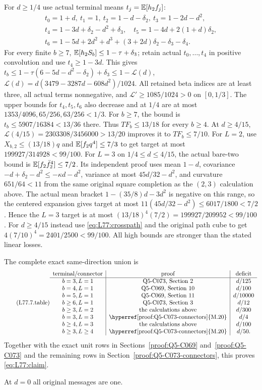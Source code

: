 For $d\ge1/4$ use actual terminal means $t_j=\mathbb E[h_2f_j]$:
\begin{equation}\tag{L77.7.1}\label{eq:L77:means}
\begin{gathered}
t_0=1+d,\ t_1=1,\ t_2=1-d-\delta_2,\ t_3=1-2d-d^2,\\
t_4=1-3d+\delta_2-d^2+\delta_3,\quad
t_5=1-4d+2(1+d)\delta_2,\\
t_6=1-5d+2d^2+d^3+(3+2d)\delta_2-\delta_3-\delta_4.
\end{gathered}
\end{equation}
For every finite $b\ge7$, $\mathbb E[h_2S_b]\le1-\tau+\delta_3$;
retain actual $t_0,\ldots,t_4$ in positive convolution and use
$t_4\ge1-3d$. This gives
$t_b\le1-\tau(6-5d-d^2-\delta_2)+\delta_3
\le1-\mathcal L(d)$,
$\mathcal L(d)=d(3479-3287d-608d^2)/1024$.
All retained beta indices are at least three, all actual terms
nonnegative, and $\mathcal L'\ge1085/1024>0$ on $[0,1/3]$.
The upper bounds for $t_4,t_5,t_6$ also decrease and at $1/4$ are
at most $1353/4096,65/256,63/256<1/3$.
For $b\ge7$, the bound is $t_b\le5907/16384<13/36$ there.
Thus $TF_b\le13/18$ for every $b\ge4$.
At $d\ge4/15$, $\mathcal L(4/15)=2303308/3456000>13/20$
improves it to $TF_b\le7/10$.
For $L=2$, use $X_{b,2}\le(13/18)q$ and
$\mathbb E[f_2q^4]\le7/3$ to get target at most
$199927/314928<99/100$.
For $L=3$ on $1/4\le d\le4/15$, the actual bare-two bound is
$\mathbb E[f_2\bar f_2^4]\le7/2$.
Its independent proof uses mean $1-d$, covariance
$-d+\delta_2-d^2\le-\kappa d-d^2$, variance at most
$45d/32-d^2$, and curvature $651/64<11$ from the same original
square completion as the $(2,3)$ calculation above.
The actual mean bracket $1-(35/8)d-3d^2$ is negative on this range,
so the centered expansion gives target at most
$11(45d/32-d^2)\le6017/1800<7/2$.
Hence the $L=3$ target is at most
$(13/18)^4(7/2)=199927/209952<99/100$.
For $d\ge4/15$ instead use \eqref{eq:L77:crosspath} and the original
path cube to get $4(7/10)^4=2401/2500<99/100$.
All high bounds are stronger than the stated linear losses.

The complete exact same-direction union is
\begin{equation}\tag{L77.7.table}\label{eq:L77:union}
\begin{array}{c|c|c}
\text{terminal/connector}&\text{proof}&\text{deficit}\\\hline
b=3,L=1&\text{Q5-C073, Section 2}&d/125\\
b=4,L=1&\text{Q5-C069, Section 10}&d/100\\
b=5,L=1&\text{Q5-C069, Section 11}&d/10000\\
b\ge6,L=1&\text{Q5-C073, Section 3}&d/12\\
b\ge3,L=2&\text{the calculations above}&d/300\\
b=3,L=3&\text{\hyperref[proof:Q5-C073-connectors]{M.20}}&d/4\\
b\ge4,L=3&\text{the calculations above}&d/100\\
b\ge3,L\ge4&\text{\hyperref[proof:Q5-C073-connectors]{M.20}}&d/50.
\end{array}
\end{equation}
Together with the exact unit rows in Sections~\ref{proof:Q5-C069}
and~\ref{proof:Q5-C073} and the remaining rows in
Section~\ref{proof:Q5-C073-connectors}, this proves \eqref{eq:L77:claim}.


At $d=0$ all original messages are one.
